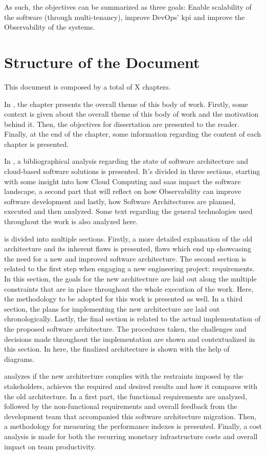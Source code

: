 As such, the objectives can be summarized as three goals: Enable scalability of the software (through multi-tenancy), improve DevOps' \gls{kpi} and improve the Observability of the systems.


\section{Structure of the Document}\label{intro:s:structure-of-the-document}

This document is composed by a total of X chapters.

In , the chapter presents the overall theme of this body of work. Firstly, some context is given about the overall theme of this body of work and the motivation behind it. Then, the objectives for dissertation are presented to the reader. Finally, at the end of the chapter, some information regarding the content of each chapter is presented.

In , a bibliographical analysis regarding the state of software architecture and cloud-based software solutions is presented. It’s divided in three sections, starting with some insight into how Cloud Computing and \gls{saas} impact the software landscape, a second part that will reflect on how Observability can improve software development and lastly,  how Software Architectures are planned, executed and then analyzed. Some text regarding the general technologies used throughout the work is also analyzed here.

 is divided into multiple sections. Firstly, a more detailed explanation of the old architecture and its inherent flaws is presented, flaws which end up showcasing the need for a new and improved software architecture. The second section is related to the first step when engaging a new engineering project: requirements. In this section, the goals for the new architecture are laid out along the multiple constraints that are in place throughout the whole execution of the work. Here, the methodology to be adopted for this work is presented as well. In a third section, the plans for implementing the new architecture are laid out chronologically. Lastly, the final section is related to the actual implementation of the proposed software architecture. The procedures taken, the challenges and decisions made throughout the implementation are shown and contextualized in this section. In here, the finalized architecture is shown with the help of diagrams. 

 analyzes if the new architecture complies with the restraints imposed by the stakeholders, achieves the required and desired results and how it compares with the old architecture. In a first part, the functional requirements are analyzed, followed by the non-functional requirements and overall feedback from the development team that accompanied this software architecture migration. Then, a methodology for measuring the performance indexes is presented. Finally, a cost analysis is made for both the recurring monetary infrastructure costs and overall impact on team productivity.

